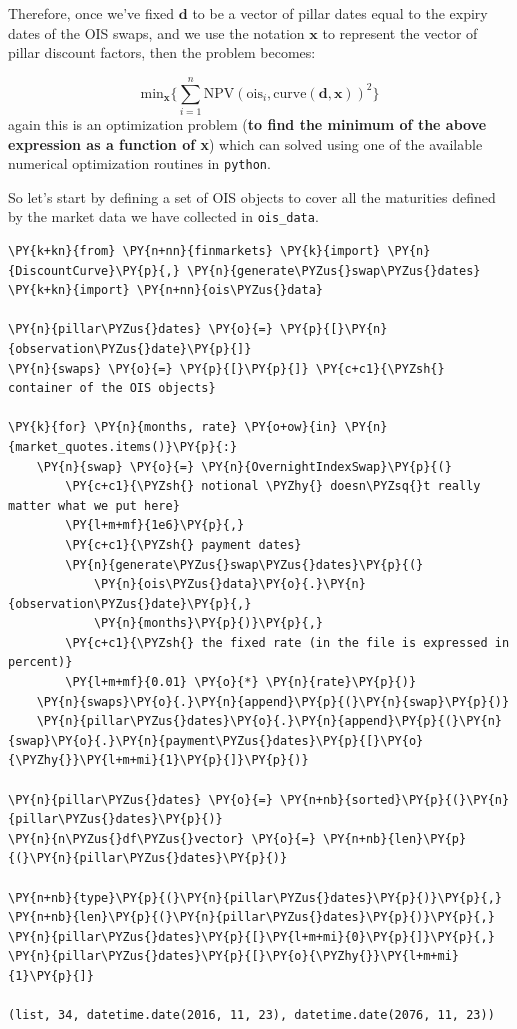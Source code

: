 Therefore, once we've fixed \(\mathbf{d}\) to be a vector of pillar dates equal to the expiry dates of the OIS swaps, and we use the notation \(\mathbf{x}\) to represent the vector of pillar discount factors, then the problem becomes:

\[\mathrm{min}_{\mathbf{x}} \Big\{\sum_{i=1}^{n}\mathrm{NPV}(\mathrm{ois}_i, \mathrm{curve(\mathbf{d}, \mathbf{x})})^2\Big\}\]
again this is an optimization problem (\textbf{to find the minimum of the above expression as a function of x}) which can solved using one of the available numerical optimization routines in \texttt{python}.

So let's start by defining a set of OIS objects to cover all the maturities defined by the market data we have collected in \texttt{ois\_data}.

\begin{tcolorbox}[breakable, size=fbox, boxrule=1pt, pad at break*=1mm,colback=cellbackground, colframe=cellborder]
\begin{Verbatim}[commandchars=\\\{\}]
\PY{k+kn}{from} \PY{n+nn}{finmarkets} \PY{k}{import} \PY{n}{DiscountCurve}\PY{p}{,} \PY{n}{generate\PYZus{}swap\PYZus{}dates}
\PY{k+kn}{import} \PY{n+nn}{ois\PYZus{}data}

\PY{n}{pillar\PYZus{}dates} \PY{o}{=} \PY{p}{[}\PY{n}{observation\PYZus{}date}\PY{p}{]}
\PY{n}{swaps} \PY{o}{=} \PY{p}{[}\PY{p}{]} \PY{c+c1}{\PYZsh{} container of the OIS objects}

\PY{k}{for} \PY{n}{months, rate} \PY{o+ow}{in} \PY{n}{market_quotes.items()}\PY{p}{:}
    \PY{n}{swap} \PY{o}{=} \PY{n}{OvernightIndexSwap}\PY{p}{(}
        \PY{c+c1}{\PYZsh{} notional \PYZhy{} doesn\PYZsq{}t really matter what we put here}
        \PY{l+m+mf}{1e6}\PY{p}{,}
        \PY{c+c1}{\PYZsh{} payment dates}
        \PY{n}{generate\PYZus{}swap\PYZus{}dates}\PY{p}{(}
            \PY{n}{ois\PYZus{}data}\PY{o}{.}\PY{n}{observation\PYZus{}date}\PY{p}{,}
            \PY{n}{months}\PY{p}{)}\PY{p}{,}
        \PY{c+c1}{\PYZsh{} the fixed rate (in the file is expressed in percent)}
        \PY{l+m+mf}{0.01} \PY{o}{*} \PY{n}{rate}\PY{p}{)}
    \PY{n}{swaps}\PY{o}{.}\PY{n}{append}\PY{p}{(}\PY{n}{swap}\PY{p}{)}
    \PY{n}{pillar\PYZus{}dates}\PY{o}{.}\PY{n}{append}\PY{p}{(}\PY{n}{swap}\PY{o}{.}\PY{n}{payment\PYZus{}dates}\PY{p}{[}\PY{o}{\PYZhy{}}\PY{l+m+mi}{1}\PY{p}{]}\PY{p}{)}
    
\PY{n}{pillar\PYZus{}dates} \PY{o}{=} \PY{n+nb}{sorted}\PY{p}{(}\PY{n}{pillar\PYZus{}dates}\PY{p}{)}
\PY{n}{n\PYZus{}df\PYZus{}vector} \PY{o}{=} \PY{n+nb}{len}\PY{p}{(}\PY{n}{pillar\PYZus{}dates}\PY{p}{)}

\PY{n+nb}{type}\PY{p}{(}\PY{n}{pillar\PYZus{}dates}\PY{p}{)}\PY{p}{,} \PY{n+nb}{len}\PY{p}{(}\PY{n}{pillar\PYZus{}dates}\PY{p}{)}\PY{p}{,} \PY{n}{pillar\PYZus{}dates}\PY{p}{[}\PY{l+m+mi}{0}\PY{p}{]}\PY{p}{,} \PY{n}{pillar\PYZus{}dates}\PY{p}{[}\PY{o}{\PYZhy{}}\PY{l+m+mi}{1}\PY{p}{]}

(list, 34, datetime.date(2016, 11, 23), datetime.date(2076, 11, 23))
\end{Verbatim}
\end{tcolorbox}

